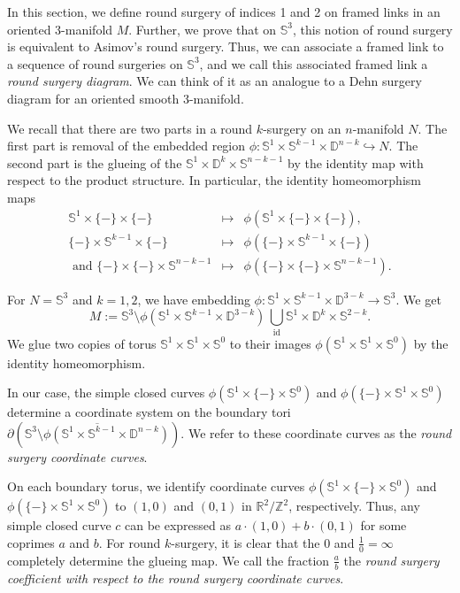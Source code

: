 \documentclass{amsart}
\theoremstyle{plain}
\theoremstyle{remark}
\theoremstyle{definition}
\newcommand{\R}{\mathbb{R}}
\newcommand{\s}{\mathbb{S}}
\newcommand{\D}{\mathbb{D}}
\newcommand{\dd}{\partial}
\begin{document}
In this section, we define round surgery of indices 1 and 2 on framed links in an oriented 3-manifold $M$. Further, we prove that on $\mathbb{S}^3$, this notion of round surgery is equivalent to Asimov's round surgery. Thus, we can associate a framed link to a sequence of round surgeries on $\mathbb{S}^3$, and we call this associated framed link a \emph{round surgery diagram}. We can think of it as an analogue to a Dehn surgery diagram for an oriented smooth 3-manifold. 

\iffalse
We recall that there are two parts in a round $k$-surgery on an $n$-manifold $N$. %
The first part is removal of the embedded region $\phi: \s^1 \times \s^{k-1} \times \D^{n-k} \hookrightarrow N$. 
The second part is the glueing of the $\s^1 \times \D^{k}\times \s^{n-k-1}$ by the identity map with respect to the product structure.
In particular, the identity homeomorphism maps 
\begin{eqnarray*}
    \s^1 \times \{-\} \times \{-\} & \mapsto &\phi(\s^1 \times \{-\} \times \{-\}),\\
    \{-\} \times \s^{k-1} \times \{-\} & \mapsto &\phi(\{-\} \times \s^{k-1} \times \{-\}) \\
    \text{ and }
    \{-\} \times \{-\}\times \s^{n-k-1} & \mapsto &\phi(\{-\} \times \{-\}\times \s^{n-k-1}). 
\end{eqnarray*}

For $N = \s^3$ and $k=1,2$, we have embedding $\phi : \s^1 \times \s^{k-1} \times \D^{3-k} \to \s^3$. We get  
$$ M:= \s^3 \setminus \phi(\s^1 \times \s^{k-1} \times \D^{3-k})\,  \bigcup_{\text{id}} \s^1 \times \D^k \times \s^{2-k}.$$ 
We glue two copies of torus $\s^1 \times \s^1 \times \s^0$ to their images $\phi(\s^1 \times \s^1 \times \s^0)$ by the identity homeomorphism.


In our case, the simple closed curves $\phi(\s^1 \times \{-\} \times \s^0)$ and $\phi(\{-\} \times \s^1 \times \s^0)$ determine a coordinate system on the boundary tori $\dd(\overline{\s^3\setminus \phi(\s^1 \times \s^{k-1}\times \D^{n-k})})$. 
We refer to these coordinate curves as the {\it round surgery coordinate curves}.

On each boundary torus, we identify coordinate curves $\phi(\s^1 \times \{-\} \times \s^0)$ and $\phi(\{-\} \times \s^1 \times \s^0)$ to $(1,0)$ and $(0,1)$ in $\R^2/\mathbb{Z}^2$, respectively.
Thus, any simple closed curve $c$ can be expressed as $a\cdot (1,0) + b\cdot (0,1)$ for some coprimes $a$ and $b$. 
For round $k$-surgery, it is clear that the $0$ and $\frac{1}{0}= \infty$ completely determine the glueing map. We call the fraction $\frac{a}{b}$ the {\it round surgery coefficient with respect to the round surgery coordinate curves}. 
\end{document}
